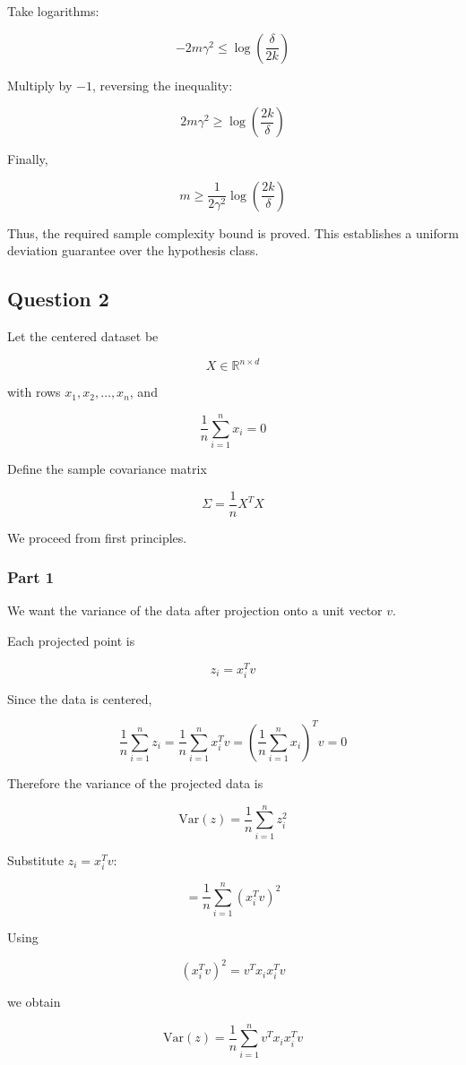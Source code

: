 \documentclass[12pt]{article}
\begin{document}
Take logarithms:

\[
-2m\gamma^2
\leq
\log\left(\frac{\delta}{2k}\right)
\]

Multiply by \(-1\), reversing the inequality:

\[
2m\gamma^2
\geq
\log\left(\frac{2k}{\delta}\right)
\]

Finally,

\[
m
\geq
\frac{1}{2\gamma^2}
\log\left(\frac{2k}{\delta}\right)
\]

Thus, the required sample complexity bound is proved.
This establishes a uniform deviation guarantee over the hypothesis class.
\subsection*{Question 2}

Let the centered dataset be

\[
X \in \mathbb R^{n\times d}
\]

with rows \(x_1,x_2,\dots,x_n\), and

\[
\frac1n\sum_{i=1}^n x_i = 0
\]

Define the sample covariance matrix

\[
\Sigma = \frac1n X^TX
\]

We proceed from first principles.

\subsubsection*{Part 1}

We want the variance of the data after projection onto a unit vector \(v\).

Each projected point is

\[
z_i = x_i^T v
\]

Since the data is centered,

\[
\frac1n\sum_{i=1}^n z_i
=
\frac1n\sum_{i=1}^n x_i^Tv
=
\left(
\frac1n\sum_{i=1}^n x_i
\right)^T v
=
0
\]

Therefore the variance of the projected data is

\[
\mathrm{Var}(z)
=
\frac1n\sum_{i=1}^n z_i^2
\]

Substitute \(z_i=x_i^Tv\):

\[
=
\frac1n\sum_{i=1}^n (x_i^Tv)^2
\]

Using

\[
(x_i^Tv)^2
=
v^Tx_i x_i^T v
\]

we obtain

\[
\mathrm{Var}(z)
=
\frac1n\sum_{i=1}^n v^Tx_i x_i^Tv
\]
\end{document}
